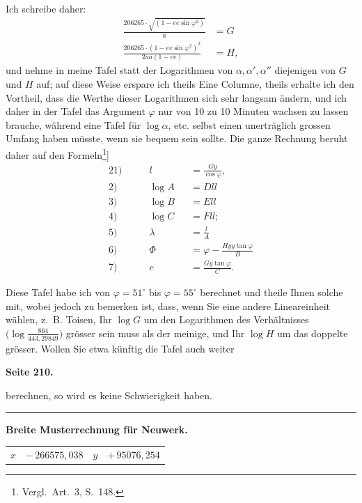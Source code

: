 \documentclass[12pt,a4paper]{article}
\newcommand{\tang}{\tan}
\theoremstyle{plain}
\theoremstyle{definition}
\theoremstyle{remark}
\begin{document}
Ich schreibe daher:
\begin{align*}
\frac{206265 \cdot \sqrt{(1 - ee \sin \varphi^2)}}{a} &= G \\
\frac{206265 \cdot (1 - ee \sin \varphi^2)^2}{2aa(1 - ee)} &= H,
\end{align*}
und nehme in meine Tafel statt der Logarithmen von $\alpha, \alpha', \alpha''$ diejenigen von $G$ und $H$ auf; auf diese Weise erspare ich theils Eine Columne, theils erhalte ich den Vortheil, dass die Werthe dieser Logarithmen sich sehr langsam ändern, und ich daher in der Tafel das Argument $\varphi$ nur von 10 zu 10 Minuten wachsen zu lassen brauche, während eine Tafel für $\log \alpha$, etc. selbst einen unerträglich grossen Umfang haben müsste, wenn sie bequem sein sollte. Die ganze Rechnung beruht daher auf den Formeln\footnote{Vergl.~Art.~3, S.~148.}]
\begin{alignat}{2}
1)\qquad & l &&= \frac{Gy}{\cos \varphi}, \\
2)\qquad & \log A &&= Dll \\
3)\qquad & \log B &&= Ell \\
4)\qquad & \log C &&= Fll; \\
5)\qquad & \lambda &&= \frac{l}{A} \\
6)\qquad & \Phi &&= \varphi - \frac{Hyy \tang \varphi}{B} \\
7)\qquad & c &&= \frac{Gy \tang \varphi}{C}.
\end{alignat}

Diese Tafel habe ich von $\varphi = 51^{\circ}$ bis $\varphi = 55^{\circ}$ berechnet und theile Ihnen solche mit, wobei jedoch zu bemerken ist, dass, wenn Sie eine andere Lineareinheit wählen, z.~B. Toisen, Ihr $\log G$ um den Logarithmen des Verhältnisses $\bigl(\log \frac{864}{443{,}29849}\bigr)$ grösser sein muss als der meinige, und Ihr $\log H$ um das doppelte grösser. Wollen Sie etwa künftig die Tafel auch weiter

\newpage
\textbf{Seite 210.}

berechnen, so wird es keine Schwierigkeit haben.

\medskip
\hrule
\medskip

\textbf{Breite Musterrechnung für Neuwerk.}

\begin{center}
\begin{tabular}{r@{\ $=$\ }l@{\qquad}r@{\ $=$\ }l}
$x$ & $-\,266575{,}038$ & $y$ & $+\,95076{,}254$
\end{tabular}
\end{center}
\end{document}
